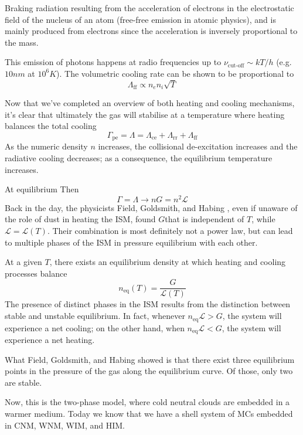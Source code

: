 Braking radiation resulting from the acceleration of electrons in the electrostatic field of the nucleus of an atom (free-free emission in atomic physics), and is mainly produced from electrons since the acceleration is inversely proportional to the mass.
\par This emission of photons happens at radio frequencies up to $\nu_{\text{cut-off}} \sim kT/h$ (e.g. $10\unit{nm}$ at $10^{6}\unit{K}$).
The volumetric cooling rate can be shown to be proportional to
\begin{equation}
    \Lambda_{\text{ff}} \propto n_{e}n_{i}\sqrt{T}
\end{equation}
\par Now that we've completed an overview of both heating and cooling mechanisms, it's clear that ultimately the gas will stabilise at a temperature where heating balances the total cooling
\begin{equation}
    \Gamma_{\text{pe}} = \Lambda = \Lambda_{\text{ce}}+\Lambda_{\text{rr}}+\Lambda_{\text{ff}}
\end{equation}
As the numeric density $n$ increases, the collisional de-excitation increases and the radiative cooling decreases; as a consequence, the equilibrium temperature increases.
\par At equilibrium Then
\begin{equation*}
    \Gamma = \Lambda \to nG = n^{2}\mathcal{L}
\end{equation*}
Back in the day, the physicists Field, Goldsmith, and Habing \cite{1969ApJ...155L.149F},  even if unaware of the role of dust in heating the ISM, found $G $that is independent of $T$, while $\mathcal{L} = \mathcal{L}(T)$. Their combination is most definitely not a power law, but can lead to multiple phases of the ISM in pressure
equilibrium with each other.
\par At a given $T$, there exists an equilibrium density at which heating and cooling processes balance
\begin{equation}
    n_{\text{eq}}(T) = \frac{G}{\mathcal{L}(T)}
\end{equation}
The presence of distinct phases in the ISM results from the distinction between stable and unstable equilibrium. In fact, whenever $n_{\text{eq}}\mathcal{L} > G$, the system will experience a net cooling; on the other hand, when $n_{\text{eq}}\mathcal{L} < G$, the system will experience a net heating.
\par What Field, Goldsmith, and Habing showed is that there exist three equilibrium points in the pressure of the gas along the equilibrium curve. Of those, only two are stable.
\par Now, this is the two-phase model, where cold neutral clouds are embedded in a warmer medium. Today we know that we have a shell system
of MCs embedded in CNM, WNM, WIM, and HIM.